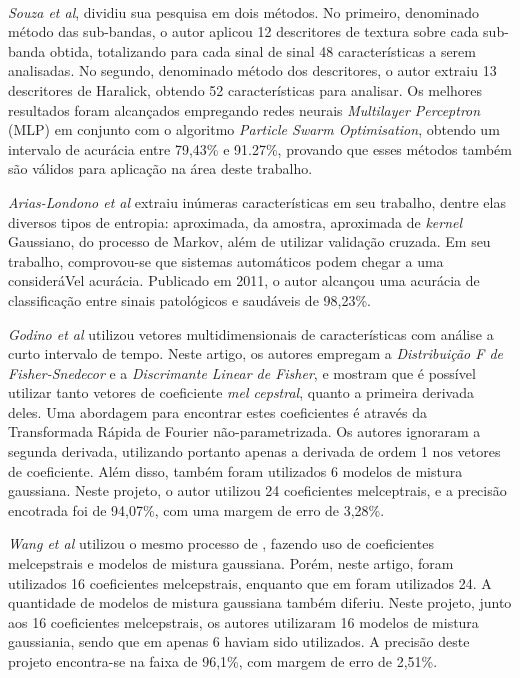 \documentclass[a4paper,12pt,oneside]{report}
\begin{document}
\\
\par \emph{Souza et al}\cite{souza_mestrado}, dividiu sua pesquisa em dois m\'{e}todos. No primeiro, denominado m\'{e}todo das sub-bandas, o autor aplicou 12 descritores de textura sobre cada sub-banda obtida, totalizando para cada sinal de sinal 48 caracter\'{i}sticas a serem analisadas. No segundo, denominado m\'{e}todo dos descritores, o autor extraiu 13 descritores de Haralick, obtendo 52 caracter\'{i}sticas para analisar. Os melhores resultados foram alcan\c{c}ados empregando redes neurais \textit{Multilayer Perceptron} (MLP) em conjunto com o algoritmo \textit{Particle Swarm Optimisation}, obtendo um intervalo de acur\'{a}cia entre 79,43\% e 91.27\%, provando que esses m\'{e}todos tamb\'{e}m s\~{a}o v\'{a}lidos para aplica\c{c}\~{a}o na \'{a}rea deste trabalho.
\\
\par \emph{Arias-Londono et al\cite{arias_londono}} extraiu in\'{u}meras caracter\'{i}sticas em seu trabalho, dentre elas diversos tipos de entropia: aproximada, da amostra, aproximada de \textit{kernel} Gaussiano, do processo de Markov, al\'{e}m de utilizar valida\c{c}\~{a}o cruzada. Em seu trabalho, comprovou-se que sistemas autom\'{a}ticos podem chegar a uma consider\'{a}Vel acur\'{a}cia. Publicado em 2011, o autor alcan\c{c}ou uma acur\'{a}cia de classifica\c{c}\~{a}o entre sinais patol\'{o}gicos e saud\'{a}veis de 98,23\%. 
\\
\par \emph{Godino et al\cite{godino}} utilizou vetores multidimensionais de caracter\'{i}sticas com an\'{a}lise a curto intervalo de tempo. Neste artigo, os autores empregam a \emph{Distribui\c{c}\~{a}o F de Fisher-Snedecor} e a \emph{Discrimante Linear de Fisher}, e mostram que \'{e} poss\'{i}vel utilizar tanto vetores de coeficiente \emph{mel cepstral}\cite{melcepstral}, quanto a primeira derivada deles. Uma abordagem para encontrar estes coeficientes \'{e} atrav\'{e}s da Transformada R\'{a}pida de Fourier n\~{a}o-parametrizada. Os autores ignoraram a segunda derivada, utilizando portanto apenas a derivada de ordem 1 nos vetores de coeficiente. Al\'{e}m disso, tamb\'{e}m foram utilizados 6 modelos de mistura gaussiana. Neste projeto, o autor utilizou 24 coeficientes melceptrais, e a precis\~{a}o encotrada foi de 94,07\%, com uma margem de erro de 3,28\%. 
\\
\par \emph{Wang et al\cite{wang}} utilizou o mesmo processo de \cite{godino}, fazendo uso de coeficientes melcepstrais e modelos de mistura gaussiana. Por\'{e}m, neste artigo, foram utilizados 16 coeficientes melcepstrais, enquanto que em \cite{godino} foram utilizados 24. A quantidade de modelos de mistura gaussiana tamb\'{e}m diferiu. Neste projeto, junto aos 16 coeficientes melcepstrais, os autores utilizaram 16 modelos de mistura gaussiania, sendo que em \cite{godino} apenas 6 haviam sido utilizados. A precis\~{a}o deste projeto encontra-se na faixa de 96,1\%, com margem de erro de 2,51\%. 
\end{document}
